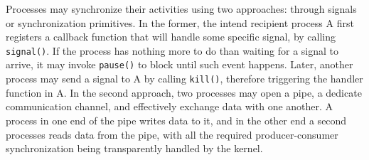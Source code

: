 		Processes may synchronize their activities using two approaches:
		through signals or synchronization primitives. In the former, the
		intend recipient process A first registers a callback function that
		will handle some specific signal, by calling \texttt{signal()}. If
		the process has nothing more to do than waiting for a signal to
		arrive, it may invoke \texttt{pause()} to block until such event
		happens. Later, another process may send a signal to A by calling
		\texttt{kill()}, therefore triggering the handler function in A. In
		the second approach, two processes may open a pipe, a dedicate
		communication channel, and effectively exchange data with one
		another. A process in one end of the pipe writes data to it, and in
		the other end a second processes reads data from the pipe, with all
		the required producer-consumer synchronization being transparently
		handled by the kernel.


